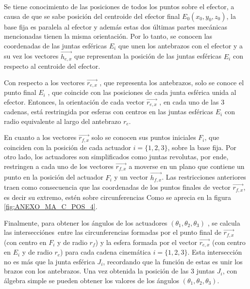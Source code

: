         Se tiene conocimiento de las posiciones de todos los puntos sobre el efector, a causa de que se sabe posición del centroide del efector final  $E_{0} \left( x_{0},y_{0},z_{0} \right)$, la base fija es paralela al efector y además estas dos últimas partes mecánicas mencionadas tienen la misma orientación. Por lo tanto, se conocen las coordenadas de las juntas esféricas  $E_{i}$  que unen los antebrazos con el efector y a su vez los vectores $\overrightarrow{h_{e,x}}$ que representan la posición de las juntas esféricas  $E_{i}$ con respecto al centroide del efector.
        
        Con respecto a los vectores $\overrightarrow{r_{e,x}}$ , que representa los antebrazos, solo se conoce el punto final $E_{i}$ , que coincide con las posiciones de cada junta esférica unida al efector. Entonces, la orientación de cada vector  $\overrightarrow{r_{e,x}}$  , en cada uno de las 3 cadenas, está restringida por esferas con centros en las juntas esféricas $E_{i}$  con radio equivalente al largo del antebrazo $r_{e}$.
             \newpage

        En cuanto a los vectores $\overrightarrow{r_{f,x}}$  solo se conocen sus puntos iniciales $F_{i}$, que coinciden con la posición de cada actuador $i= \{ 1,2,3 \}$, sobre la base fija. Por otro lado, los actuadores son simplificados como juntas revolutas, por ende, restringen a cada uno de los vectores  $\overrightarrow{r_{f,x}}$ a moverse en un plano que contiene un punto en la posición del actuador  $F_{i}$ y un vector  $\overrightarrow{h_{f,x}}$. Las restricciones anteriores traen como consecuencia que las coordenadas de los puntos finales de vector  $\overrightarrow{r_{f,x}}$, es decir su extremo, estén sobre circunferencias Como se aprecia en la figura \ref{fig:ANEXO_MA_C_POS_4}.
        
        Finalmente, para obtener los ángulos de los actuadores  $\left(  \theta _{1}, \theta _{2}, \theta _{3} \right)$  , se calcula las intersecciónes\ entre las circunferencias formadas por el punto final de   $\overrightarrow{r_{f,x}}$  (con centro en  $F_{i}$ y de radio  $r_{f}$) y la esfera formada por el vector  $\overrightarrow{r_{e,x}}$ (con centro en  $E_{i}$ y de radio $r_{e}$) para cada cadena cinemática  $i= \{ 1,2,3 \}$. Esta intersección no es más que la junta esférica  $J_{i}$, recordando que la función de estas es unir los brazos con los antebrazos. Una vez obtenida la posición de las 3 juntas $J_{i}$, con álgebra simple se pueden obtener los valores de los ángulos $\left(  \theta _{1}, \theta _{2}, \theta _{3} \right)$.
        
